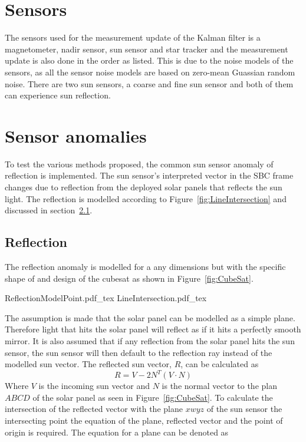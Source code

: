 \documentclass[letterpaper, 10 pt, conference]{ieeeconf}  %
\begin{document}
\section{Sensors}
The sensors used for the measurement update of the Kalman filter is a magnetometer, nadir sensor, sun sensor and star tracker and the measurement update is also done in the order as listed. This is due to the noise models of the sensors, as all the sensor noise models are based on zero-mean Guassian random noise. There are two sun sensors, a coarse and fine sun sensor and both of them can experience sun reflection.

\section{Sensor anomalies}
To test the various methods proposed, the common sun sensor anomaly of reflection is implemented. The sun sensor's interpreted vector in the SBC frame changes due to reflection from the deployed solar panels that reflects the sun light. The reflection is modelled according to Figure~\ref{fig:LineIntersection} and discussed in section~\ref{section:Reflection}.

\subsection{Reflection}
\label{section:Reflection}
The reflection anomaly is modelled for a any dimensions but with the specific shape of and design of the cubesat as shown in Figure~\ref{fig:CubeSat}.

\begin{figure*}[!hbt]
	\centering
	\def\svgwidth{7cm}
	{ReflectionModelPoint.pdf_tex}
	\centering
	\def\svgwidth{7cm}
	{LineIntersection.pdf_tex}
	\caption{Reflection}
	\label{fig:LineIntersection}
\end{figure*}

The assumption is made that the solar panel can be modelled as a simple plane. Therefore light that hits the solar panel will reflect as if it hits a perfectly smooth mirror. It is also assumed that if any reflection from the solar panel hits the sun sensor, the sun sensor will then default to the reflection ray instead of the modelled sun vector. The reflected sun vector, $R$, can be calculated as
\begin{equation}
	R = V - 2N^T(V \cdot N)
\end{equation}
Where $V$ is the incoming sun vector and $N$ is the normal vector to the plan $ABCD$ of the solar panel as seen in Figure~\ref{fig:CubeSat}. To calculate the intersection of the reflected vector with the plane $xwyz$ of the sun sensor the intersecting point the equation of the plane, reflected vector and the point of origin is required. The equation for a plane can be denoted as 
\end{document}
